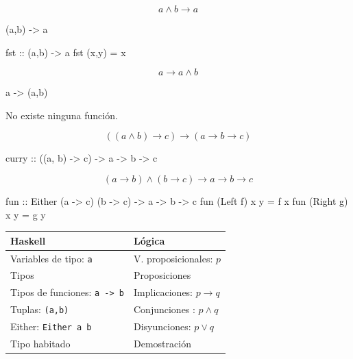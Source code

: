 \documentclass{beamer}
\begin{document}
\begin{frame}[fragile]
  $$a \wedge b \rightarrow a $$
\pause

\begin{sesion}  
(a,b) -> a
\end{sesion}

\pause

\begin{code}
fst :: (a,b) -> a
fst (x,y) = x
\end{code}

\end{frame}

\begin{frame}[fragile]
  $$a \rightarrow a\wedge b $$

\pause
\begin{sesion}
a -> (a,b)
\end{sesion}
  
\pause
No existe ninguna función.
\end{frame}

\begin{frame}[fragile]
  $$((a\wedge b) \rightarrow c) \rightarrow (a \rightarrow b \rightarrow c) $$
\pause
  
\begin{code}
curry :: ((a, b) -> c) -> a -> b -> c
  
\end{code}
\end{frame}

\begin{frame}[fragile]
  $$(a\rightarrow b) \wedge (b\rightarrow c) \rightarrow a \rightarrow b \rightarrow c  $$

  \pause
  
\begin{code}
fun :: Either (a -> c) (b -> c) -> a -> b -> c
fun (Left f)  x y = f x
fun (Right g) x y = g y
\end{code}
\end{frame}

\begin{frame}
\begin{table}[htbp]
\begin{center}
\begin{tabular}{|l|l|}
\hline
Haskell & Lógica \\
\hline \hline
Variables de tipo:  \texttt{a} & V. proposicionales: $p$  \\ \hline
Tipos & Proposiciones \\ \hline
Tipos de funciones: \texttt{a -> b} & Implicaciones: $p\rightarrow q$ \\ \hline
Tuplas: \texttt{(a,b)} & Conjunciones : $p\wedge q$ \\ \hline
Either: \texttt{Either a b} & Disyunciones: $p\vee q$ \\ \hline  
Tipo habitado & Demostración \\ \hline  
\end{tabular}
\end{center}
\end{table}
  

\end{frame}
\end{document}
